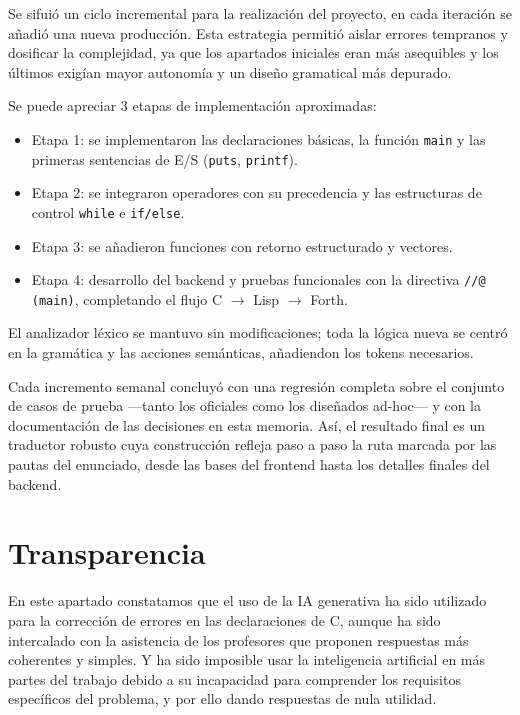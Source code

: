 \documentclass[12pt,a4paper]{article}
\begin{document}
\noindent Se sifuió un ciclo incremental para la realización del proyecto, en cada iteración se añadió una nueva producción. 
Esta estrategia permitió aislar errores tempranos y dosificar la complejidad, ya que los apartados iniciales 
eran más asequibles y los últimos exigían mayor autonomía y un diseño gramatical más depurado.

\smallskip
\noindent Se puede apreciar 3 etapas de implementación aproximadas:
\begin{itemize}
    \item Etapa 1: se implementaron las declaraciones básicas, la función \texttt{main} y las primeras 
    sentencias de E/S (\texttt{puts}, \texttt{printf}).
    \item Etapa 2: se integraron operadores con su precedencia y las estructuras de control 
    \texttt{while} e \texttt{if/else}.
    \item Etapa 3: se añadieron funciones con retorno estructurado y vectores.
    \item Etapa 4: desarrollo del backend y pruebas funcionales con la directiva 
    \texttt{//@ (main)}, completando el flujo C $\to$ Lisp $\to$ Forth.
\end{itemize}

\smallskip
\noindent El analizador léxico se mantuvo sin modificaciones; toda la lógica nueva se centró en la 
gramática y las acciones semánticas, añadiendon los tokens necesarios.
\smallskip

\noindent Cada incremento semanal concluyó con una regresión completa sobre el conjunto de casos de prueba 
—tanto los oficiales como los diseñados ad-hoc— y con la documentación de las decisiones en esta memoria. 
Así, el resultado final es un traductor robusto cuya construcción refleja paso a paso la ruta marcada por 
las pautas del enunciado, desde las bases del frontend hasta los detalles finales del backend.
\section{Transparencia}

\noindent En este apartado constatamos que el uso de la IA generativa ha sido utilizado para la 
corrección de errores en las declaraciones de C, aunque ha sido intercalado con la asistencia de los 
profesores que proponen respuestas más coherentes y simples. Y ha sido imposible usar la inteligencia 
artificial en más partes del trabajo debido a su incapacidad para comprender los requisitos específicos 
del problema, y por ello dando respuestas de nula utilidad.
\end{document}
